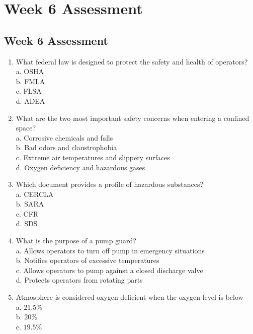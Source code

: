 
\chapter{Week 6 Assessment}

\section*{Week 6 Assessment}
\begin{enumerate}[1.]
\item What federal law is designed to protect the safety and health of operators?\\
a. OSHA\\
b. FMLA\\
c. FLSA\\
d. ADEA\\
\item What are the two most important safety concerns when entering a confined space?\\
a. Corrosive chemicals and falls\\
b. Bad odors and claustrophobia\\
c. Extreme air temperatures and slippery surfaces\\
d. Oxygen deficiency and hazardous gases\\
\item Which document provides a profile of hazardous substances?\\
a. CERCLA\\
b. SARA\\
c. CFR\\
d. SDS\\
\item What is the purpose of a pump guard?\\
a. Allows operators to turn off pump in emergency situations\\
b. Notifies operators of excessive temperatures\\
c. Allows operators to pump against a closed discharge valve\\
d. Protects operators from rotating parts\\
\item Atmosphere is considered oxygen deficient when the oxygen level is below\\
a. $21.5 \%$\\
b. $20 \%$\\
c. $19.5 \%$\\

\end{enumerate}

